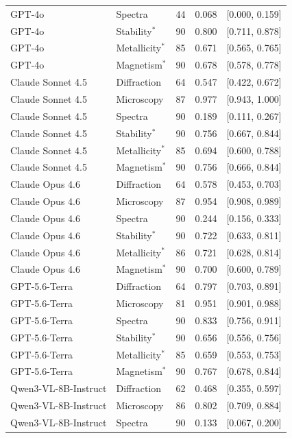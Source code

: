 \documentclass[pdflatex,sn-nature]{sn-jnl}
\begin{document}
\begin{table}[h]
{\begin{tabular}{l l S[table-format=3.0] S[table-format=1.3] c}
GPT-4o & Spectra & 44 & 0.068 & [0.000, 0.159] \\
GPT-4o & Stability$^{*}$ & 90 & 0.800 & [0.711, 0.878] \\
GPT-4o & Metallicity$^{*}$ & 85 & 0.671 & [0.565, 0.765] \\
GPT-4o & Magnetism$^{*}$ & 90 & 0.678 & [0.578, 0.778] \\
\addlinespace
Claude Sonnet 4.5 & Diffraction & 64 & 0.547 & [0.422, 0.672] \\
Claude Sonnet 4.5 & Microscopy & 87 & 0.977 & [0.943, 1.000] \\
Claude Sonnet 4.5 & Spectra & 90 & 0.189 & [0.111, 0.267] \\
Claude Sonnet 4.5 & Stability$^{*}$ & 90 & 0.756 & [0.667, 0.844] \\
Claude Sonnet 4.5 & Metallicity$^{*}$ & 85 & 0.694 & [0.600, 0.788] \\
Claude Sonnet 4.5 & Magnetism$^{*}$ & 90 & 0.756 & [0.666, 0.844] \\
\addlinespace
Claude Opus 4.6 & Diffraction & 64 & 0.578 & [0.453, 0.703] \\
Claude Opus 4.6 & Microscopy & 87 & 0.954 & [0.908, 0.989] \\
Claude Opus 4.6 & Spectra & 90 & 0.244 & [0.156, 0.333] \\
Claude Opus 4.6 & Stability$^{*}$ & 90 & 0.722 & [0.633, 0.811] \\
Claude Opus 4.6 & Metallicity$^{*}$ & 86 & 0.721 & [0.628, 0.814] \\
Claude Opus 4.6 & Magnetism$^{*}$ & 90 & 0.700 & [0.600, 0.789] \\
\addlinespace
GPT-5.6-Terra & Diffraction & 64 & 0.797 & [0.703, 0.891] \\
GPT-5.6-Terra & Microscopy & 81 & 0.951 & [0.901, 0.988] \\
GPT-5.6-Terra & Spectra & 90 & 0.833 & [0.756, 0.911] \\
GPT-5.6-Terra & Stability$^{*}$ & 90 & 0.656 & [0.556, 0.756] \\
GPT-5.6-Terra & Metallicity$^{*}$ & 85 & 0.659 & [0.553, 0.753] \\
GPT-5.6-Terra & Magnetism$^{*}$ & 90 & 0.767 & [0.678, 0.844] \\
\addlinespace
Qwen3-VL-8B-Instruct & Diffraction & 62 & 0.468 & [0.355, 0.597] \\
Qwen3-VL-8B-Instruct & Microscopy & 86 & 0.802 & [0.709, 0.884] \\
Qwen3-VL-8B-Instruct & Spectra & 90 & 0.133 & [0.067, 0.200] \\

\end{tabular}}
\end{table}
\end{document}
